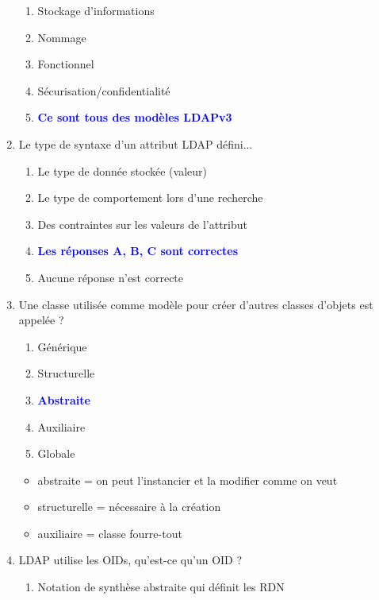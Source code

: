 \documentclass[a4paper]{article}
\begin{document}
\begin{enumerate}
    \begin{enumerate}
        \item Stockage d'informations
        \item Nommage
        \item Fonctionnel
        \item Sécurisation/confidentialité
        \item \textcolor{blue}{\textbf{Ce sont tous des modèles LDAPv3}}
    \end{enumerate}
    \item Le type de syntaxe d'un attribut LDAP défini...
    \begin{enumerate}
        \item Le type de donnée stockée (valeur)
        \item Le type de comportement lors d'une recherche
        \item Des contraintes sur les valeurs de l'attribut
        \item \textcolor{blue}{\textbf{Les réponses A, B, C sont correctes}}
        \item Aucune réponse n'est correcte
    \end{enumerate}
    \item Une classe utilisée comme modèle pour créer d'autres classes d'objets est appelée ?
    \begin{enumerate}
        \item Générique
        \item Structurelle
        \item \textcolor{blue}{\textbf{Abstraite}}
        \item Auxiliaire
        \item Globale
    \end{enumerate}
    \begin{example} \begin{itemize}
        \item abstraite = on peut l'instancier et la modifier comme on veut
        \item structurelle = nécessaire à la création
        \item auxiliaire = classe fourre-tout
    \end{itemize} \end{example}
    \item LDAP utilise les OIDs, qu'est-ce qu'un OID ?
    \begin{enumerate}
        \item Notation de synthèse abstraite qui définit les RDN

\end{enumerate}
\end{enumerate}
\end{document}
